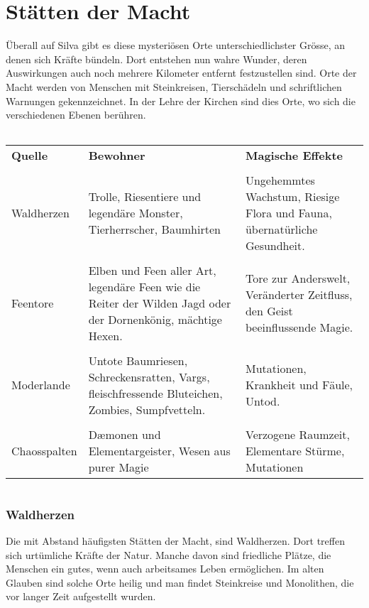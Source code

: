 \documentclass[10pt,twoside,twocolumn,openany]{book}
\begin{document}
\section{Stätten der Macht}
Überall auf Silva gibt es diese mysteriösen Orte unterschiedlichster Grösse, an denen sich Kräfte bündeln. Dort entstehen nun wahre Wunder, deren Auswirkungen auch noch mehrere Kilometer entfernt festzustellen sind. Orte der Macht werden von Menschen mit Steinkreisen, Tierschädeln und schriftlichen Warnungen gekennzeichnet. In der Lehre der Kirchen sind dies Orte, wo sich die verschiedenen Ebenen berühren.
\begin{table*}
	\begin{tabular}{l}
	\hline
	\end{tabular}
	\begin{tabularx}{\textwidth}{lXX}
		\textbf{Quelle} & \textbf{Bewohner} & \textbf{Magische Effekte}\\
		&&\\
		Waldherzen & Trolle, Riesentiere und legendäre Monster, Tierherrscher, Baumhirten &Ungehemmtes Wachstum, Riesige Flora und Fauna, übernatürliche Gesundheit.\\
		&&\\
		Feentore & Elben und Feen aller Art, legendäre Feen wie die Reiter der Wilden Jagd oder der Dornenkönig, mächtige Hexen. & Tore zur Anderswelt, Veränderter Zeitfluss, den Geist beeinflussende Magie.\\
		&&\\
		Moderlande & Untote Baumriesen, Schreckensratten, Vargs, fleischfressende Bluteichen, Zombies, Sumpfvetteln. &Mutationen, Krankheit und Fäule, Untod.\\
		&&\\
		Chaosspalten & D\ae monen und Elementargeister, Wesen aus purer Magie & Verzogene Raumzeit, Elementare Stürme, Mutationen \\
	\end{tabularx}
	\begin{tabular}{l}
	\hline
	\end{tabular}
\end{table*}

\subsubsection{Waldherzen}
Die mit Abstand häufigsten Stätten der Macht, sind Waldherzen. Dort treffen sich urtümliche Kräfte der Natur. Manche davon sind friedliche Plätze, die Menschen ein gutes, wenn auch arbeitsames Leben ermöglichen. Im alten Glauben sind solche Orte heilig und man findet Steinkreise und Monolithen, die vor langer Zeit aufgestellt wurden. 
\end{document}
